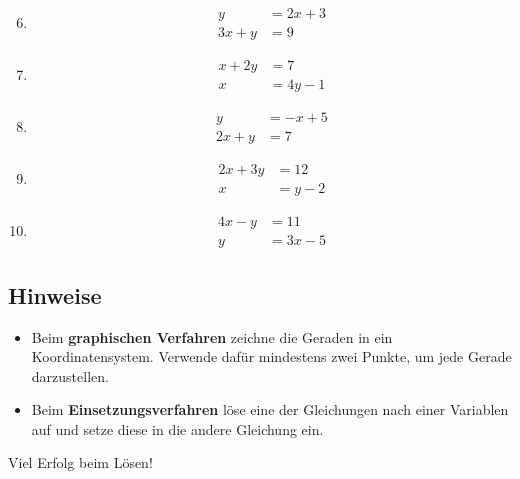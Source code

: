 \begin{enumerate}
    \setcounter{enumi}{5}
    \item
    \[
    \begin{aligned}
    y &= 2x + 3 \\
    3x + y &= 9
    \end{aligned}
    \]

    \item
    \[
    \begin{aligned}
    x + 2y &= 7 \\
    x &= 4y - 1
    \end{aligned}
    \]

    \item
    \[
    \begin{aligned}
    y &= -x + 5 \\
    2x + y &= 7
    \end{aligned}
    \]

    \item
    \[
    \begin{aligned}
    2x + 3y &= 12 \\
    x &= y - 2
    \end{aligned}
    \]

    \item
    \[
    \begin{aligned}
    4x - y &= 11 \\
    y &= 3x - 5
    \end{aligned}
    \]
\end{enumerate}

\subsection*{Hinweise}
\begin{itemize}
    \item Beim \textbf{graphischen Verfahren} zeichne die Geraden in ein Koordinatensystem. Verwende dafür mindestens zwei Punkte, um jede Gerade darzustellen.
    \item Beim \textbf{Einsetzungsverfahren} löse eine der Gleichungen nach einer Variablen auf und setze diese in die andere Gleichung ein.
\end{itemize}

Viel Erfolg beim Lösen! 